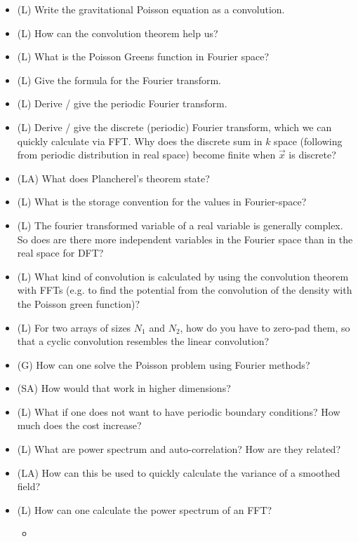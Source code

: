 \begin{itemize}
    \item (L) Write the gravitational Poisson equation as a convolution.
    \item (L) How can the convolution theorem help us?
    \item (L) What is the Poisson Greens function in Fourier space?
    \item (L) Give the formula for the Fourier transform. 
    \item (L) Derive / give the periodic Fourier transform.
    \item (L) Derive / give the discrete (periodic) Fourier transform, which we can quickly calculate via FFT.
    Why does the discrete sum in $k$ space (following from periodic distribution in real space) become finite when $\vec{x}$ is discrete?
    \item (LA) What does Plancherel's theorem state?
    \item (L) What is the storage convention for the values in Fourier-space?
    \item (L) The fourier transformed variable of a real variable is generally complex.
    So does are there more independent variables in the Fourier space than in the real space for DFT?
    \item (L) What kind of convolution is calculated by using the convolution theorem with FFTs
    (e.g. to find the potential from the convolution of the density with the Poisson green function)?
    \item (L) For two arrays of sizes $N_1$ and $N_2$, how do you have to zero-pad them, so that
    a cyclic convolution resembles the linear convolution?
    \item (G) How can one solve the Poisson problem using Fourier methods?
    \item (SA) How would that work in higher dimensions?
    \item (L) What if one does not want to have periodic boundary conditions? How much does the cost increase?
    \item (L) What are power spectrum and auto-correlation? How are they related?
    \item (LA) How can this be used to quickly calculate the variance of a smoothed field?
    \item (L) How can one calculate the power spectrum of an FFT?
    \begin{itemize}
        \item {}

\end{itemize}
\end{itemize}
